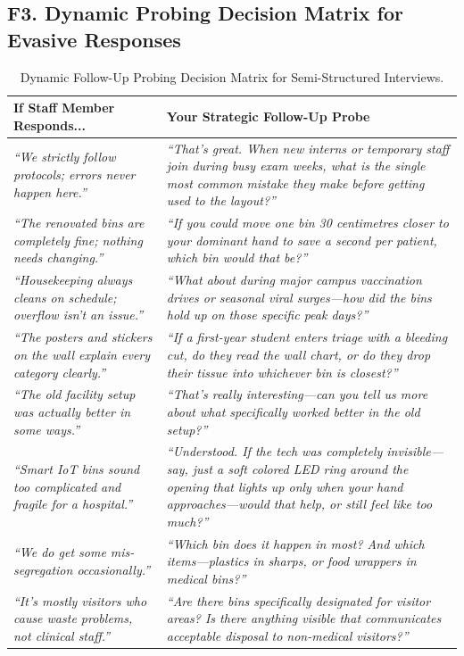 \documentclass[11pt,a4paper]{article}
\begin{document}
\subsection{F3. Dynamic Probing Decision Matrix for Evasive Responses}
\begin{table}[h!]
\centering
\small
\renewcommand{\arraystretch}{1.25}
\begin{tabularx}{\textwidth}{p{5.5cm}X}
\toprule
\rowcolor{iitblue}
\color{white}\textbf{If Staff Member Responds...} & \color{white}\textbf{Your Strategic Follow-Up Probe} \\
\midrule
\emph{``We strictly follow protocols; errors never happen here.''} & \emph{``That's great. When new interns or temporary staff join during busy exam weeks, what is the single most common mistake they make before getting used to the layout?''} \\
\rowcolor{softgray}
\emph{``The renovated bins are completely fine; nothing needs changing.''} & \emph{``If you could move one bin 30 centimetres closer to your dominant hand to save a second per patient, which bin would that be?''} \\
\emph{``Housekeeping always cleans on schedule; overflow isn't an issue.''} & \emph{``What about during major campus vaccination drives or seasonal viral surges---how did the bins hold up on those specific peak days?''} \\
\rowcolor{softgray}
\emph{``The posters and stickers on the wall explain every category clearly.''} & \emph{``If a first-year student enters triage with a bleeding cut, do they read the wall chart, or do they drop their tissue into whichever bin is closest?''} \\
\emph{``The old facility setup was actually better in some ways.''} & \emph{``That's really interesting---can you tell us more about what specifically worked better in the old setup?''} \\
\rowcolor{softgray}
\emph{``Smart IoT bins sound too complicated and fragile for a hospital.''} & \emph{``Understood. If the tech was completely invisible---say, just a soft colored LED ring around the opening that lights up only when your hand approaches---would that help, or still feel like too much?''} \\
\emph{``We do get some mis-segregation occasionally.''} & \emph{``Which bin does it happen in most? And which items---plastics in sharps, or food wrappers in medical bins?''} \\
\rowcolor{softgray}
\emph{``It's mostly visitors who cause waste problems, not clinical staff.''} & \emph{``Are there bins specifically designated for visitor areas? Is there anything visible that communicates acceptable disposal to non-medical visitors?''} \\
\bottomrule
\end{tabularx}
\caption{Dynamic Follow-Up Probing Decision Matrix for Semi-Structured Interviews.}
\end{table}
\end{document}
